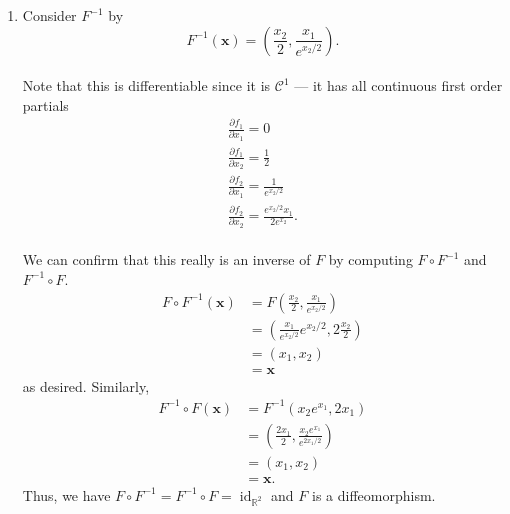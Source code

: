 \documentclass[12 pt, letterpaper]{hmcpset}
\begin{document}
\begin{solution}
\begin{enumerate}
			\[
				\begin{split}
					\mathcal{M}(DF \Big |_{\mathbf{x}}) & = \begin{bmatrix}
						\frac{\partial f_1}{\partial x_1} & \frac{\partial f_1}{x_2} \\
						\frac{\partial f_2}{\partial x_1} & \frac{\partial f_2}{x_2}
					\end{bmatrix} \\
									    & = \begin{bmatrix}
						x_2 e^{x_1} & e^{x_1} \\
						2 & 0
					\end{bmatrix}.
				\end{split}
			\]
			Since this has determinant $-2e^{x_1}$ which is positive for all $x_1 \in \mathbb{R}$, this is always invertible, and thus, $F$ is regular.
		\item 
			Consider $F^{-1}$ by
			\[
				F^{-1}(\mathbf{x}) = \left ( \frac{x_2}{2}, \frac{x_1}{e^{x_2/2}} \right ).
			\] \\
			Note that this is differentiable since it is $\mathcal{C}^1$ --- it has all continuous first order partials
			\[
				\begin{gathered}
					\frac{\partial f_1}{\partial x_1} = 0 \\
					\frac{\partial f_1}{\partial x_2} = \frac{1}{2} \\
					\frac{\partial f_2}{\partial x_1} = \frac{1}{e^{x_2/2}} \\
					\frac{\partial f_2}{\partial x_2} = \frac{e^{x_2/2} x_1}{2 e^{x_2}}.
				\end{gathered}
			\] \\
			We can confirm that this really is an inverse of $F$ by computing $F \circ F^{-1}$ and $F^{-1} \circ F$.
			\[
				\begin{split}
					F \circ F^{-1}(\mathbf{x}) & = F(\frac{x_2}{2}, \frac{x_1}{e^{x_2/2}}) \\
								   & = \left ( \frac{x_1}{e^{x_2/2}} e^{x_2/2}, 2 \frac{x_2}{2} \right ) \\
								   & = \left ( x_1, x_2 \right ) \\
								   & = \mathbf{x}
				\end{split}
			\]
			as desired. Similarly,
			\[
				\begin{split}
					F^{-1} \circ F(\mathbf{x}) & = F^{-1}(x_2 e^{x_1}, 2 x_1) \\
								   & = (\frac{2 x_1}{2}, \frac{x_2 e^{x_1}}{e^{2x_1/2}}) \\
								   & = (x_1, x_2) \\
								   & = \mathbf{x}.
				\end{split}
			\]
			Thus, we have $F \circ F^{-1} = F^{-1} \circ F = \operatorname{id}_{\mathbb{R}^2}$ and $F$ is a diffeomorphism.
	\end{enumerate}
\end{solution}
\end{document}
